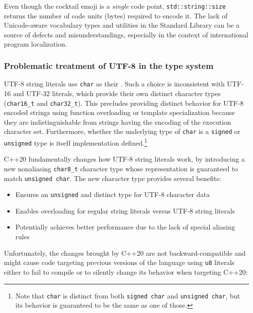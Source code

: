 \noindent Even though the cocktail emoji is a \emph{single} code point,
\lstinline!std::string::size! returns the number of code units (bytes) required to
encode it. The lack of Unicode-aware vocabulary types and utilities in
the Standard Library can be a source of defects and misunderstandings,
especially in the context of international program localization.

\subsubsection[Problematic treatment of UTF-8 in the type system]{Problematic treatment of UTF-8 in the type system}\label{utf-8-quirks}

UTF-8 string literals use \lstinline!char! as their . Such a
choice is inconsistent with UTF-16 and UTF-32 literals, which provide
their own distinct character types (\lstinline!char16_t! and
\lstinline!char32_t!). This precludes providing distinct behavior for UTF-8 encoded strings using function overloading or template specialization because they are indistinguishable from strings having the encoding of the execution character set. Furthermore, whether the underlying
type of \lstinline!char! is a \lstinline!signed! or \lstinline!unsigned! type is
itself implementation defined.{\cprotect\footnote{Note that
\lstinline!char! is distinct from both \lstinline!signed!~\lstinline!char! and
\lstinline!unsigned!~\lstinline!char!, but its behavior is guaranteed to be
  the same as one of those.}}
  
C++20
fundamentally changes how UTF-8 string literals work, by introducing a
new nonaliasing \lstinline!char8_t! character type whose representation
is guaranteed to match \lstinline!unsigned!~\lstinline!char!. The new
character type provides several benefits:
\begin{itemize}
\item{Ensures an \lstinline!unsigned! and distinct type for UTF-8 character data}
\item{Enables overloading for regular string literals versus UTF-8 string literals}
\item{Potentially achieves better performance due to the lack of special aliasing rules}
\end{itemize}
Unfortunately, the changes brought by C++20 are not
backward-compatible and might cause code targeting previous versions
of the language using \lstinline!u8! literals either to fail to compile
or to silently change its behavior when targeting C++20:

